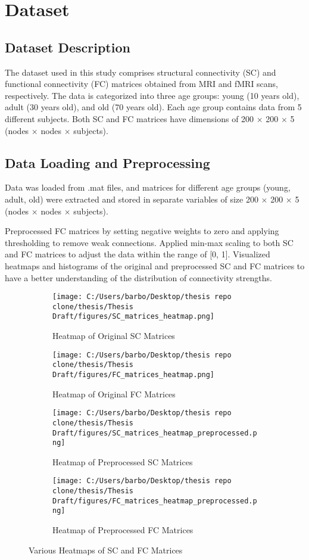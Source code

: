 
\section{Dataset}

\subsection{Dataset Description}
The dataset used in this study comprises structural connectivity (SC) and functional connectivity (FC) matrices 
obtained from MRI and fMRI scans, respectively. The data is categorized into three age groups: 
young (10 years old), adult (30 years old), and old (70 years old). Each age group contains data from 5 different subjects.
Both SC and FC matrices have dimensions of 200 $\times$ 200 $\times$ 5 (nodes $\times$ nodes $\times$ subjects).

\subsection{Data Loading and Preprocessing}
Data was loaded from .mat files, and matrices for different age groups (young, adult, old) were extracted and stored in separate variables of size 200 $\times$ 200 $\times$ 5 (nodes $\times$ nodes $\times$ subjects).

Preprocessed FC matrices by setting negative weights to zero and applying thresholding to remove weak connections. Applied min-max scaling to both SC and FC matrices to adjust the data within the range of [0, 1].
Visualized heatmaps and histograms of the original and preprocessed SC and FC matrices to have a better understanding of the distribution of connectivity strengths.

\begin{figure}[h!]
    \centering
    \begin{subfigure}[b]{0.45\textwidth}
        \texttt{[image: C:/Users/barbo/Desktop/thesis repo clone/thesis/Thesis Draft/figures/SC\_matrices\_heatmap.png]}
        \caption{Heatmap of Original SC Matrices}
    \end{subfigure}
    \begin{subfigure}[b]{0.45\textwidth}
        \texttt{[image: C:/Users/barbo/Desktop/thesis repo clone/thesis/Thesis Draft/figures/FC\_matrices\_heatmap.png]}
        \caption{Heatmap of Original FC Matrices}
    \end{subfigure}
    \begin{subfigure}[b]{0.45\textwidth}
        \texttt{[image: C:/Users/barbo/Desktop/thesis repo clone/thesis/Thesis Draft/figures/SC\_matrices\_heatmap\_preprocessed.png]}
        \caption{Heatmap of Preprocessed SC Matrices}
    \end{subfigure}
    \begin{subfigure}[b]{0.45\textwidth}
        \texttt{[image: C:/Users/barbo/Desktop/thesis repo clone/thesis/Thesis Draft/figures/FC\_matrices\_heatmap\_preprocessed.png]}
        \caption{Heatmap of Preprocessed FC Matrices}
    \end{subfigure}
    \caption{Various Heatmaps of SC and FC Matrices}
\end{figure}


